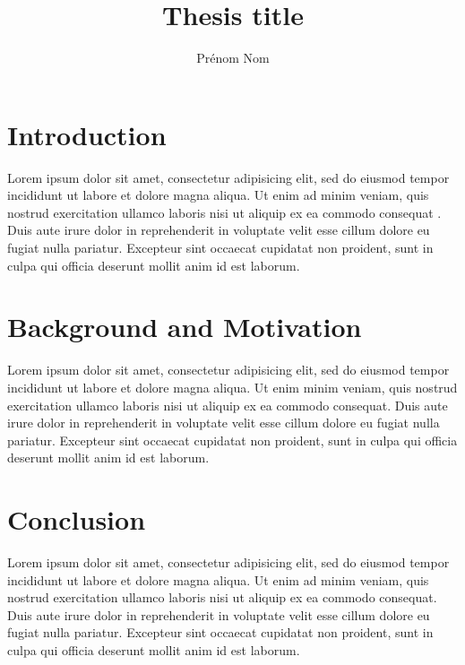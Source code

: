 \documentclass[anglais]{thesis-ubl}
\title{Thesis title}
\author{Prénom Nom}
\begin{document}
\pagestyle{empty}
\frontmatter

\cleartorecto


\cleartorecto
\tableofcontents*

\clearpage
\pagestyle{ruled}
\mainmatter


\chapter{Introduction}

Lorem ipsum dolor sit amet, consectetur adipisicing elit, sed do eiusmod tempor incididunt ut labore et dolore magna aliqua. Ut enim ad minim veniam, quis nostrud exercitation ullamco laboris nisi ut aliquip ex ea commodo consequat \cite{wilcoxon1992individual}. Duis aute irure dolor in reprehenderit in voluptate velit esse cillum dolore eu fugiat nulla pariatur. Excepteur sint occaecat cupidatat non proident, sunt in culpa qui officia deserunt mollit anim id est laborum.

\chapter{Background and Motivation}

Lorem ipsum dolor sit amet, consectetur adipisicing elit, sed do eiusmod tempor incididunt ut labore et dolore magna aliqua. Ut enim \cite{ozsu2011principles} minim veniam, quis nostrud exercitation ullamco laboris nisi ut aliquip ex ea commodo consequat. Duis aute irure dolor in reprehenderit in voluptate velit esse cillum dolore eu fugiat nulla pariatur. Excepteur sint occaecat cupidatat non proident, sunt in culpa qui officia deserunt mollit anim id est laborum.

\chapter{Conclusion}

Lorem ipsum dolor sit amet, consectetur adipisicing elit, sed do eiusmod tempor incididunt ut labore et dolore magna aliqua. Ut enim ad minim veniam, quis nostrud exercitation ullamco laboris nisi ut aliquip ex ea commodo consequat. Duis aute irure dolor in reprehenderit in voluptate velit esse cillum dolore eu fugiat nulla pariatur. Excepteur sint occaecat cupidatat non proident, sunt in culpa qui officia deserunt mollit anim id est laborum.
\end{document}
